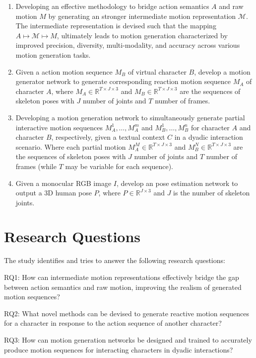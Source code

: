 \begin{enumerate}
	\item Developing an effective methodology to bridge action semantics $A$ and raw motion $M$ by generating an stronger intermediate motion representation $\mathcal{M}$. The intermediate representation is devised such that the mapping $A\mapsto \mathcal{M} \mapsto M$, ultimately leads to motion generation characterized by improved precision, diversity, multi-modality, and accuracy across various motion generation tasks.
	\item Given a action motion sequence $M_B$ of virtual character $B$, develop a motion generator network to generate corresponding reaction motion sequence $M_A$ of character $A$, where $M_A \in \mathbb{R}^{T \times J \times 3}$ and $M_B \in \mathbb{R}^{T \times J \times 3}$ are the sequences of skeleton poses with $J$ number of joints and $T$ number of frames.
	\item Developing a motion generation network to simultaneously generate partial interactive motion sequences ${M_A^1, \dots, M_A^m}$ and ${M_B^1, \dots, M_B^n}$ for character $A$ and character $B$, respectively, given a textual context $C$ in a dyadic interaction scenario. Where each partial motion $M_A^M \in \mathbb{R}^{T \times J \times 3}$ and $M_B^N \in \mathbb{R}^{T \times J \times 3}$ are the sequences of skeleton poses with $J$ number of joints and $T$ number of frames (while $T$ may be variable for each sequence).
	\item Given a monocular RGB image $I$, develop an pose estimation network to output a 3D human pose $P$, where $P \in \mathbb{R}^{J \times 3}$ and $J$ is the number of skeleton joints.
\end{enumerate}


\section{Research Questions}

The study identifies and tries to answer the following research questions:

RQ1: How can intermediate motion representations effectively bridge the gap between action semantics and raw motion, improving the realism of generated motion sequences?

RQ2: What novel methods can be devised to generate reactive motion sequences for a character in response to the action sequence of another character?

RQ3: How can motion generation networks be designed and trained to accurately produce motion sequences for interacting characters in dyadic interactions?

